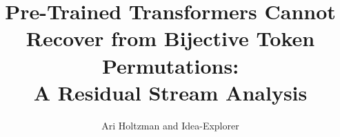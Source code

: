 \documentclass{article}
\title{Pre-Trained Transformers Cannot Recover from Bijective Token Permutations: \\A Residual Stream Analysis}
\author{Ari Holtzman and Idea-Explorer}
\begin{document}
\maketitle

\begin{abstract}

\end{abstract}










\end{document}
